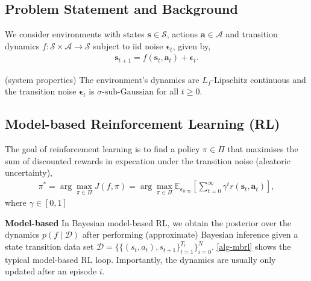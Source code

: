 \documentclass{article}
\newcommand{\state}{\ensuremath{\mathbf{s}}}
\newcommand{\action}{\ensuremath{\mathbf{a}}}
\newcommand{\noise}{\ensuremath{\bm\epsilon}}
\newcommand{\discount}{\ensuremath{\gamma}}
\newcommand{\stateDomain}{\ensuremath{\mathcal{S}}}
\newcommand{\actionDomain}{\ensuremath{\mathcal{A}}}
\newcommand{\policyDomain}{\ensuremath{\Pi}}
\newcommand{\rewardFn}{\ensuremath{r}}
\newcommand{\transitionFn}{\ensuremath{f}}
\newcommand{\policy}{\ensuremath{\pi}}
\begin{document}
\subsection{Problem Statement and Background} \label{sec:problem-statement}
We consider environments with states \(\state \in \stateDomain \), actions \(\action \in \actionDomain\) and transition dynamics \(\transitionFn: \stateDomain \times \actionDomain \rightarrow \stateDomain \) subject to
iid noise \(\noise_{t}\), given by,
\begin{align}
\state_{t+1} = \transitionFn(\state_{t}, \action_{t}) + \noise_{t}.
\end{align}
\begin{assumption}
  (system properties) The environment's dynamics are $L_{\transitionFn}\text{-Lipschitz}$ continuous and the transition noise $\noise_{t}$ is $\sigma\text{-sub-Gaussian}$ for all $t \geq 0$.
\end{assumption}

\subsection{Model-based Reinforcement Learning (RL)}
The goal of reinforcement learning is to find a policy \(\pi \in \Pi\) that maximises the sum of discounted
rewards in expecation under the transition noise (aleatoric uncertainty),
\begin{align} \label{eq-model-free-objective}
\policy^{*} = \arg \max_{\policy \in \policyDomain} J(\transitionFn, \policy) = \arg \max_{\policy \in \policyDomain} \mathbb{E}_{\noise_{0:\infty}} \left[ \sum_{t=0}^{\infty} \discount^{t} \rewardFn(\state_{t},\action_{t}) \right],
\end{align}
where $\gamma \in [0, 1]$

\textbf{Model-based}
In Bayesian model-based RL, we obtain the posterior over the dynamics \(p(f\mid\mathcal{D})\) after performing (approximate) Bayesian
inference given a state transition data set \(\mathcal{D} = \{\{(s_{t},a_{t}), s_{t+1}\}^{T_{i}}_{t=1}\}_{i=0}^{N}\).
\cref{alg-mbrl} shows the typical model-based RL loop.
Importantly, the dynamics are usually only updated after an episode $i$.
\end{document}
